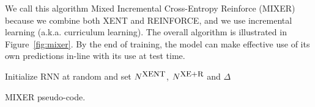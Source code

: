 We call this algorithm Mixed Incremental Cross-Entropy Reinforce (MIXER)
because we combine both XENT and REINFORCE, and we use incremental 
learning (a.k.a. curriculum learning). 
The overall algorithm is illustrated in Figure~\ref{fig:mixer}. 
By the end of training, the model can make effective use of its own 
predictions in-line with its use at test time.

\begin{algorithm}[t]
\footnotesize
 Initialize RNN at random and set $N^{\mbox{\small{XENT}}}$, $N^{\mbox{\small{XE+R}}}$
 and $\Delta$\; 
 \caption{MIXER pseudo-code.}
 \label{alg:mixer}
\end{algorithm}
